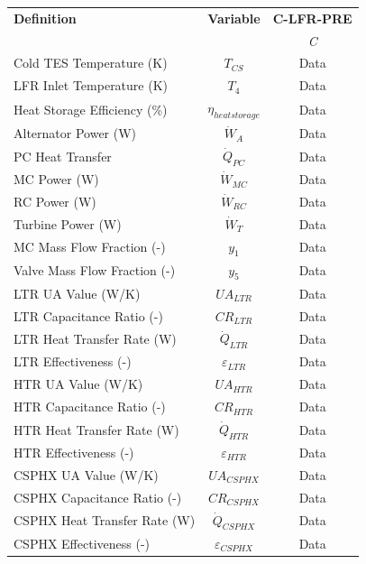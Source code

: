 \begin{paracol}{2}
\begin{specialtable}[H]
    \caption{Calculated system parameters for salt charging C-LFR-PRE cycle configuration with TES cold storage set to 663.2 K.\label{tab-c-lfr-pre}}
    \begin{tabular}{lcc}
    \toprule
    \textbf{Definition} & \textbf{Variable} & \textbf{C-LFR-PRE}\\
    & & \textit{C}\\
    \midrule	
    Cold TES Temperature (K)	&	$T_{CS}$	&	Data	\\
    LFR Inlet Temperature (K)	&	$T_{4}$	&	Data	\\
    Heat Storage Efficiency (\%)	&	$\eta_{heatstorage}$	&	Data	\\
    Alternator Power (W)	&	$\dot{W}_{A}$	&	Data	\\
    PC Heat Transfer	&	$\dot{Q}_{PC}$	&	Data	\\
    MC Power (W)	&	$\dot{W}_{MC}$	&	Data	\\
    RC Power (W)	&	$\dot{W}_{RC}$	&	Data	\\
    Turbine Power (W)	&	$\dot{W}_{T}$	&	Data	\\
    MC Mass Flow Fraction (-)	&	$y_{1}$	&	Data	\\
    Valve Mass Flow Fraction (-)	&	$y_{5}$	&	Data	\\
    LTR UA Value (W/K)	&	$UA_{LTR}$	&	Data	\\
    LTR Capacitance Ratio (-)	&	$CR_{LTR}$	&	Data	\\
    LTR Heat Transfer Rate (W)	&	$\dot{Q}_{LTR}$	&	Data	\\
    LTR Effectiveness (-)	&	$\varepsilon_{LTR}$	&	Data	\\
    HTR UA Value (W/K)	&	$UA_{HTR}$	&	Data	\\
    HTR Capacitance Ratio (-)	&	$CR_{HTR}$	&	Data	\\
    HTR Heat Transfer Rate (W)	&	$\dot{Q}_{HTR}$	&	Data	\\
    HTR Effectiveness (-)	&	$\varepsilon_{HTR}$	&	Data	\\
    CSPHX UA Value (W/K)	&	$UA_{CSPHX}$	&	Data	\\
    CSPHX Capacitance Ratio (-)	&	$CR_{CSPHX}$	&	Data	\\
    CSPHX Heat Transfer Rate (W)	&	$\dot{Q}_{CSPHX}$	&	Data	\\
    CSPHX Effectiveness (-)	&	$\varepsilon_{CSPHX}$	&	Data	\\
    \bottomrule
    \end{tabular}\\
\end{specialtable}


\end{paracol}
